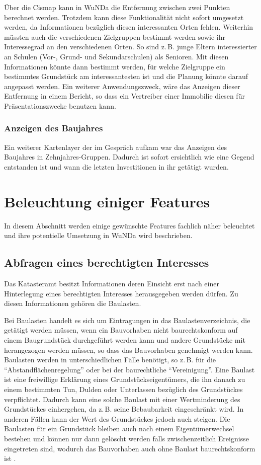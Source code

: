 Über die Cismap kann in \ac{WuNDa} die Entfernung zwischen zwei Punkten berechnet werden.
Trotzdem kann diese Funktionalität nicht sofort umgesetzt werden, da Informationen bezüglich diesen interessanten Orten fehlen.
Weiterhin müssten auch die verschiedenen Zielgruppen bestimmt werden sowie ihr Interessegrad an den verschiedenen Orten.
So sind z.\,B. junge Eltern interessierter an Schulen (Vor-, Grund- und Sekundarschulen) als Senioren.
Mit diesen Informationen könnte dann bestimmt werden, für welche Zielgruppe ein bestimmtes Grundstück am interessantesten ist und die Planung könnte darauf angepasst werden.
Ein weiterer Anwendungszweck, wäre das Anzeigen dieser Entfernung in einem Bericht, so dass ein Vertreiber einer Immobilie diesen für Präsentationszwecke benutzen kann.

\subsubsection{Anzeigen des Baujahres}
Ein weiterer Kartenlayer der im Gespräch aufkam war das Anzeigen des Baujahres in Zehnjahres-Gruppen.
Dadurch ist sofort ersichtlich wie eine Gegend entstanden ist und wann die letzten Investitionen in ihr getätigt wurden.


\section{Beleuchtung einiger Features}

In diesem Abschnitt werden einige gewünschte Features fachlich näher beleuchtet und ihre potentielle Umsetzung in \ac{WuNDa} wird beschrieben.

\subsection{Abfragen eines berechtigten Interesses}
\label{subsec:berechtigtes-interesse}
Das Katasteramt besitzt Informationen deren Einsicht erst nach einer Hinterlegung eines berechtigten Interesses herausgegeben werden dürfen.
Zu diesen Informationen gehören die Baulasten.

Bei Baulasten handelt es sich um Eintragungen in das Baulastenverzeichnis, die getätigt werden müssen, wenn ein Bauvorhaben nicht baurechtskonform auf einem Baugrundstück durchgeführt werden kann und andere Grundstücke mit herangezogen werden müssen, so dass das Bauvorhaben genehmigt werden kann.
Baulasten werden in unterschiedlichen Fälle benötigt, so z.\,B. für die \enquote{Abstandflächenregelung} oder bei der baurechtliche \enquote{Vereinigung}.
Eine Baulast ist eine freiwillige Erklärung eines Grundstückseigentümers, die ihn danach zu einem bestimmten Tun, Dulden oder Unterlassen bezüglich des Grundstückes verpflichtet.
Dadurch kann eine solche Baulast mit einer Wertminderung des Grundstückes einhergehen, da z.\,B. seine Bebaubarkeit eingeschränkt wird.
In anderen Fällen kann der Wert des Grundstückes jedoch auch steigen.
Die Baulasten für ein Grundstück bleiben auch nach einem Eigentümerwechsel bestehen und können nur dann gelöscht werden falls zwischenzeitlich Ereignisse eingetreten sind, wodurch das Bauvorhaben auch ohne Baulast baurechtskonform ist \autocite[vgl.][]{herne-baulasten}.

